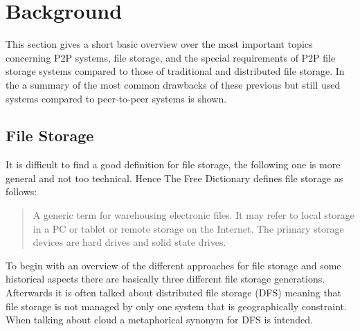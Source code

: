 \section{Background} %
\label{sec:background}
This section gives a short basic overview over the most important topics concerning P2P systems, file storage, and the special requirements of P2P file storage systems compared to those of traditional and distributed file storage. In the a summary of the most common drawbacks of these previous but still used systems compared to peer-to-peer systems is shown.

\subsection{File Storage}
It is difficult to find a good definition for file storage, the following one is more general and not too technical. Hence The Free Dictionary defines file storage as follows:
\begin{quote}
A generic term for warehousing electronic files. It may refer to local storage in a PC or tablet or remote storage on the Internet. The primary storage devices are hard drives and solid state drives\cite{thefreedictionary}.
\end{quote}
To begin with an overview of the different approaches for file storage and some historical aspects there are basically three different file storage generations. Afterwards it is often talked about distributed file storage (DFS) meaning that file storage is not managed by only one system that is geographically constraint. When talking about cloud a metaphorical synonym for DFS is intended.

